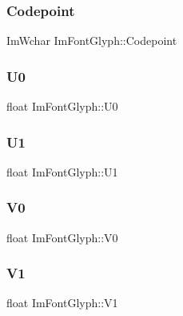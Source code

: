 \hypertarget{struct_im_font_glyph_a3ff56d019068137a3df514caa3961421}{}\label{struct_im_font_glyph_a3ff56d019068137a3df514caa3961421} 
\subsubsection{\texorpdfstring{Codepoint}{Codepoint}}
{\footnotesize\ttfamily Im\+Wchar Im\+Font\+Glyph\+::\+Codepoint}

\hypertarget{struct_im_font_glyph_a3c9d90fb39f6beaf9d69413fa4c8366f}{}\label{struct_im_font_glyph_a3c9d90fb39f6beaf9d69413fa4c8366f} 
\subsubsection{\texorpdfstring{U0}{U0}}
{\footnotesize\ttfamily float Im\+Font\+Glyph\+::\+U0}

\hypertarget{struct_im_font_glyph_aaca9625f2d6972016e05fed583db85b0}{}\label{struct_im_font_glyph_aaca9625f2d6972016e05fed583db85b0} 
\subsubsection{\texorpdfstring{U1}{U1}}
{\footnotesize\ttfamily float Im\+Font\+Glyph\+::\+U1}

\hypertarget{struct_im_font_glyph_a26b7b7b9ee43ab67e98af9ea1131ce20}{}\label{struct_im_font_glyph_a26b7b7b9ee43ab67e98af9ea1131ce20} 
\subsubsection{\texorpdfstring{V0}{V0}}
{\footnotesize\ttfamily float Im\+Font\+Glyph\+::\+V0}

\hypertarget{struct_im_font_glyph_a3d28904aad639835cdff3e4416663d7c}{}\label{struct_im_font_glyph_a3d28904aad639835cdff3e4416663d7c} 
\subsubsection{\texorpdfstring{V1}{V1}}
{\footnotesize\ttfamily float Im\+Font\+Glyph\+::\+V1}

